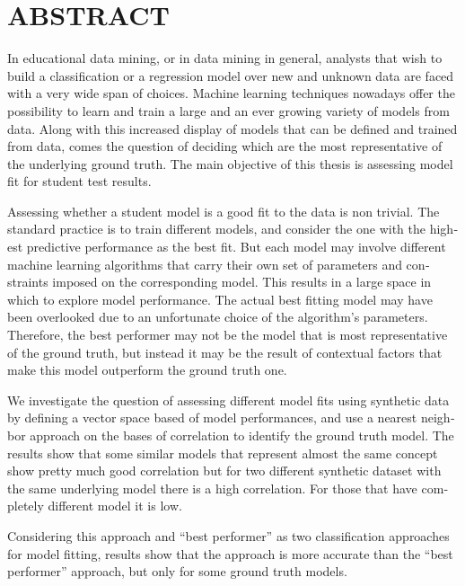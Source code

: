 %

\chapter*{ABSTRACT}\thispagestyle{headings}
%
\begin{otherlanguage}{english}

In educational data mining, or in data mining in general, analysts that wish to build a classification or a regression model over new and unknown data are faced with a very wide span of choices.  Machine learning techniques nowadays offer the possibility to learn and train a large and an ever growing variety of models from data. Along with this increased display of models that can be defined and trained from data, comes the question of deciding which are the most representative of the underlying ground truth.  The main objective of this thesis is assessing model fit for student test results.

Assessing whether a student model is a good fit to the data is non trivial.  The standard practice is to train different models, and consider the one with the highest predictive performance as the best fit. But each model may involve different machine learning algorithms that carry their own set of parameters and constraints imposed on the corresponding model.  This results in a large space in which to explore model performance.  The actual best fitting model may have been overlooked due to an unfortunate choice of the algorithm's parameters.  Therefore, the best performer may not be the model that is most representative of the ground truth, but instead it may be the result of contextual factors that make this model outperform the ground truth one.  

We investigate the question of assessing different model fits using synthetic data by defining a vector space based of model performances, and use a nearest neighbor approach on the bases of correlation to identify the ground truth model. The results show that some similar models that represent almost the same concept show pretty much good correlation but for two different synthetic dataset with the same underlying model there is a high correlation. For those that have completely different model it is low. 

Considering this approach and ``best performer'' as two classification approaches for model fitting, results show that the approach is more accurate than the ``best performer'' approach, but only for some ground truth models.


\end{otherlanguage}
